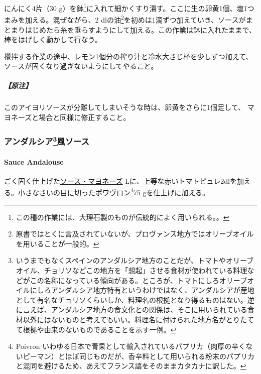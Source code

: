 \begin{recette}
にんにく4片（30 g）を鉢\footnote{この種の作業には、大理石製のものが伝統的によく用いられる。。}に入れて細かくすり潰す。ここに生の卵黄1個、塩1つまみを加える。混ぜながら、2\undemi{}
dlの油\footnote{原書ではとくに言及されていないが、プロヴァンス地方ではオリーブオイルを用いることが一般的。}を初めは1滴ずつ加えていき、ソースがまとまりはじめたら糸を垂らすようにして加える。この作業は鉢に入れたままで、棒をはげしく動かして行なう。

攪拌する作業の途中、レモン1個分の搾り汁と冷水大さじ\undemi{}杯を少しずつ加えて、ソースが固くなり過ぎないようにしてやること。

\hypertarget{ux539fux6ce8}{%
\subparagraph{【原注】}\label{ux539fux6ce8}}

このアイヨリソースが分離してしまいそうな時は、卵黄をさらに1個足して、
マヨネーズと場合と同様に修正すること。

\maeaki

\hypertarget{ux30a2ux30f3ux30c0ux30ebux30b7ux30a25ux98a8ux30bdux30fcux30b9}{%
\subsubsection[アンダルシア風ソース]{\texorpdfstring{アンダルシア\footnote{いうまでもなくスペインのアンダルシア地方のことだが、トマトやオリーブオイル、チョリソなどこの地方を「想起」させる食材が使われている料理などがこの名称になっている傾向がある。ところが、トマトにしろオリーブオイルにしろアンダルシア地方特有というわけではなく、アンダルシアが産地として有名なチョリソくらいしか、料理名の根拠となり得るものはない。逆に言えば、アンダルシア地方の食文化との関係は、そこに用いられている食材以外にはないものと考えてもいい。料理名に付けられた地方名がとりたてて根拠や由来のないものであることを示す一例。}風ソース}{アンダルシア風ソース}}\label{ux30a2ux30f3ux30c0ux30ebux30b7ux30a25ux98a8ux30bdux30fcux30b9}}

\hypertarget{sauce-andalouse}{%
\paragraph{Sauce Andalouse}\label{sauce-andalouse}}


ごく固く仕上げた\protect\hyperlink{mayonnaise}{ソース・マヨネーズ}\troisquarts{}
Lに、上等な赤いトマトピュレ2\undemi{}dlを加える。小さなさいの目に切ったポワヴロン\footnote{Poivron
  いわゆる日本で青果として輸入されているパプリカ（肉厚の辛くないピーマン）とほぼ同じものだが、香辛料として用いられる粉末のパプリカと混同を避けるため、あえてフランス語をそのままカタカナに訳した。}75
gを仕上げに加える。


\end{recette}

